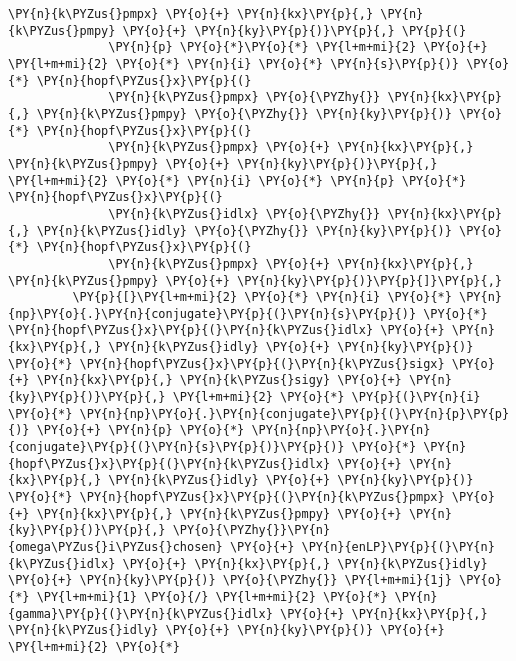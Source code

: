\begin{Verbatim}[commandchars=\\\{\}]
              \PY{n}{k\PYZus{}pmpx} \PY{o}{+} \PY{n}{kx}\PY{p}{,} \PY{n}{k\PYZus{}pmpy} \PY{o}{+} \PY{n}{ky}\PY{p}{)}\PY{p}{,} \PY{p}{(}
              \PY{n}{p} \PY{o}{*}\PY{o}{*} \PY{l+m+mi}{2} \PY{o}{+} \PY{l+m+mi}{2} \PY{o}{*} \PY{n}{i} \PY{o}{*} \PY{n}{s}\PY{p}{)} \PY{o}{*} \PY{n}{hopf\PYZus{}x}\PY{p}{(}
              \PY{n}{k\PYZus{}pmpx} \PY{o}{\PYZhy{}} \PY{n}{kx}\PY{p}{,} \PY{n}{k\PYZus{}pmpy} \PY{o}{\PYZhy{}} \PY{n}{ky}\PY{p}{)} \PY{o}{*} \PY{n}{hopf\PYZus{}x}\PY{p}{(}
              \PY{n}{k\PYZus{}pmpx} \PY{o}{+} \PY{n}{kx}\PY{p}{,} \PY{n}{k\PYZus{}pmpy} \PY{o}{+} \PY{n}{ky}\PY{p}{)}\PY{p}{,} \PY{l+m+mi}{2} \PY{o}{*} \PY{n}{i} \PY{o}{*} \PY{n}{p} \PY{o}{*} \PY{n}{hopf\PYZus{}x}\PY{p}{(}
              \PY{n}{k\PYZus{}idlx} \PY{o}{\PYZhy{}} \PY{n}{kx}\PY{p}{,} \PY{n}{k\PYZus{}idly} \PY{o}{\PYZhy{}} \PY{n}{ky}\PY{p}{)} \PY{o}{*} \PY{n}{hopf\PYZus{}x}\PY{p}{(}
              \PY{n}{k\PYZus{}pmpx} \PY{o}{+} \PY{n}{kx}\PY{p}{,} \PY{n}{k\PYZus{}pmpy} \PY{o}{+} \PY{n}{ky}\PY{p}{)}\PY{p}{]}\PY{p}{,}
         \PY{p}{[}\PY{l+m+mi}{2} \PY{o}{*} \PY{n}{i} \PY{o}{*} \PY{n}{np}\PY{o}{.}\PY{n}{conjugate}\PY{p}{(}\PY{n}{s}\PY{p}{)} \PY{o}{*} \PY{n}{hopf\PYZus{}x}\PY{p}{(}\PY{n}{k\PYZus{}idlx} \PY{o}{+} \PY{n}{kx}\PY{p}{,} \PY{n}{k\PYZus{}idly} \PY{o}{+} \PY{n}{ky}\PY{p}{)} \PY{o}{*} \PY{n}{hopf\PYZus{}x}\PY{p}{(}\PY{n}{k\PYZus{}sigx} \PY{o}{+} \PY{n}{kx}\PY{p}{,} \PY{n}{k\PYZus{}sigy} \PY{o}{+} \PY{n}{ky}\PY{p}{)}\PY{p}{,} \PY{l+m+mi}{2} \PY{o}{*} \PY{p}{(}\PY{n}{i} \PY{o}{*} \PY{n}{np}\PY{o}{.}\PY{n}{conjugate}\PY{p}{(}\PY{n}{p}\PY{p}{)} \PY{o}{+} \PY{n}{p} \PY{o}{*} \PY{n}{np}\PY{o}{.}\PY{n}{conjugate}\PY{p}{(}\PY{n}{s}\PY{p}{)}\PY{p}{)} \PY{o}{*} \PY{n}{hopf\PYZus{}x}\PY{p}{(}\PY{n}{k\PYZus{}idlx} \PY{o}{+} \PY{n}{kx}\PY{p}{,} \PY{n}{k\PYZus{}idly} \PY{o}{+} \PY{n}{ky}\PY{p}{)} \PY{o}{*} \PY{n}{hopf\PYZus{}x}\PY{p}{(}\PY{n}{k\PYZus{}pmpx} \PY{o}{+} \PY{n}{kx}\PY{p}{,} \PY{n}{k\PYZus{}pmpy} \PY{o}{+} \PY{n}{ky}\PY{p}{)}\PY{p}{,} \PY{o}{\PYZhy{}}\PY{n}{omega\PYZus{}i\PYZus{}chosen} \PY{o}{+} \PY{n}{enLP}\PY{p}{(}\PY{n}{k\PYZus{}idlx} \PY{o}{+} \PY{n}{kx}\PY{p}{,} \PY{n}{k\PYZus{}idly} \PY{o}{+} \PY{n}{ky}\PY{p}{)} \PY{o}{\PYZhy{}} \PY{l+m+mi}{1j} \PY{o}{*} \PY{l+m+mi}{1} \PY{o}{/} \PY{l+m+mi}{2} \PY{o}{*} \PY{n}{gamma}\PY{p}{(}\PY{n}{k\PYZus{}idlx} \PY{o}{+} \PY{n}{kx}\PY{p}{,} \PY{n}{k\PYZus{}idly} \PY{o}{+} \PY{n}{ky}\PY{p}{)} \PY{o}{+} \PY{l+m+mi}{2} \PY{o}{*}

\end{Verbatim}
